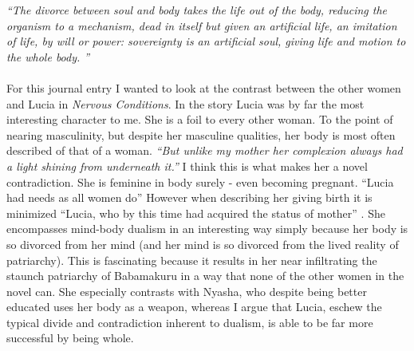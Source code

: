 

\maketitle
\textit{``The divorce between soul and body takes the life out of the body, reducing the organism to a mechanism, dead in itself but given an artificial life, an imitation of life, by will or power: sovereignty is an artificial soul, giving life and motion to the whole body. ''}
\paragraph{}

For this journal entry I wanted to look at the contrast between the other women and Lucia in \textit{Nervous Conditions}. In the story Lucia was by far the most interesting character to me. She is a foil to every other woman. To the point of nearing masculinity, but despite her masculine qualities, her body is most often described of that of a woman. \textit{``But unlike my mother her complexion always had a light shining from underneath it.'' } I think this is what makes her a novel contradiction. She is feminine in body surely - even becoming pregnant. ``Lucia had needs as all women do'' However when describing her giving birth it is minimized ``Lucia, who by this time had acquired the status of mother'' .  She encompasses mind-body dualism in an interesting way simply because her body is so divorced from her mind (and her mind is so divorced from the lived reality of patriarchy). This is fascinating because it results in her near infiltrating the staunch patriarchy of Babamakuru in a way that none of the other women in the novel can. She especially contrasts with Nyasha, who despite being better educated uses her body as a weapon, whereas I argue that Lucia, eschew the typical divide and contradiction inherent to dualism, is able to be far more successful by being whole.





